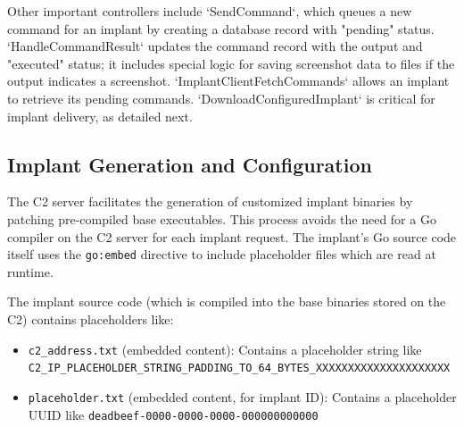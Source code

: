 Other important controllers include `SendCommand`, which queues a new command for an implant by creating a database record with "pending" status. `HandleCommandResult` updates the command record with the output and "executed" status; it includes special logic for saving screenshot data to files if the output indicates a screenshot. `ImplantClientFetchCommands` allows an implant to retrieve its pending commands. `DownloadConfiguredImplant` is critical for implant delivery, as detailed next.

\subsection{Implant Generation and Configuration}
The C2 server facilitates the generation of customized implant binaries by patching pre-compiled base executables. This process avoids the need for a Go compiler on the C2 server for each implant request. The implant's Go source code itself uses the \texttt{go:embed} directive to include placeholder files which are read at runtime.

The implant source code (which is compiled into the base binaries stored on the C2) contains placeholders like:
\begin{itemize}
    \item \texttt{c2\_address.txt} (embedded content): Contains a placeholder string like \verb|C2_IP_PLACEHOLDER_STRING_PADDING_TO_64_BYTES_XXXXXXXXXXXXXXXXXXXXX|
    \item \texttt{placeholder.txt} (embedded content, for implant ID): Contains a placeholder UUID like \verb|deadbeef-0000-0000-0000-000000000000|
\end{itemize}

